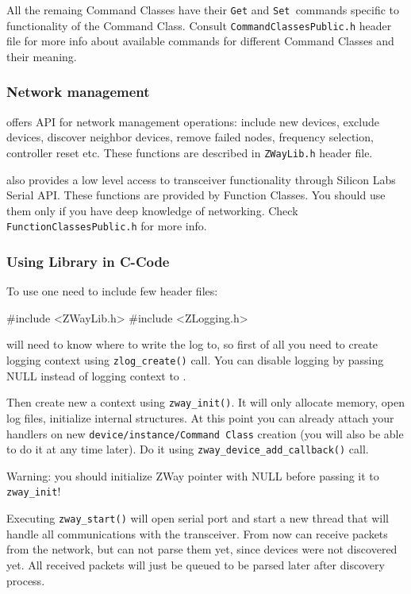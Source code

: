 All the remaing Command Classes have their \texttt{Get} and \texttt{Set }commands 
specific to functionality of the Command Class. Consult 
\texttt{CommandClassesPublic.h} header file for more info about available commands 
for different Command Classes and their meaning.

\subsubsection{Network management}

\zway offers API for network management operations: include new devices, exclude devices, 
discover neighbor devices, remove failed nodes, frequency selection, controller reset etc. 
These functions are described in \texttt{ZWayLib.h} header file.

\zway also provides a low level access to \zwave transceiver functionality through Silicon 
Labs Serial API. These functions are provided by Function Classes. You should use 
them only if you have deep knowledge of \zwave networking. Check 
\texttt{FunctionClassesPublic.h} for more info.

\subsubsection{Using \zway Library in C-Code}

To use \zway one need to include few header files:
\begin{listingverbatim}
\string#include <ZWayLib.h>
\string#include <ZLogging.h>
\end{listingverbatim}

\zway will need to know where to write the log to, so first of all you need to create 
logging context using \texttt{zlog\_create()} call. You can disable logging by passing NULL 
instead of logging context to \zway.

Then create new a \zway context using \texttt{zway\_init()}. It will only allocate memory, 
open log files, initialize internal structures. At this point you can already attach your 
handlers on new \texttt{device/instance/Command Class} creation (you will also be able 
to do it at any time later). Do it using \texttt{zway\_device\_add\_callback()} call. 

Warning: you should initialize ZWay pointer with NULL before passing it to \texttt{zway\_init}!

Executing \texttt{zway\_start()} will open serial port and start a new thread that 
will handle all communications with the transceiver. From now \zway can receive packets 
from the network, but can not parse them yet, since devices were not discovered yet. 
All received packets will just be queued to be parsed later after discovery process.

